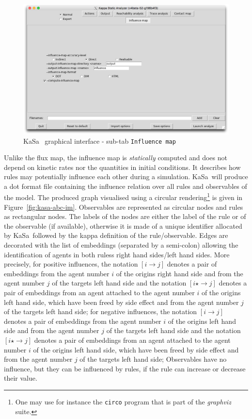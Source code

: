 \documentclass[11pt]{book}
\def\KaSa{\textsf{KaSa}}
\def\ttt#1{\texttt{#1}}
\def\rar{\rightarrow}
\begin{document}
\begin{figure}[htbp]
\centering
\includegraphics[width=12cm,bb=0 0 1904 1208]{img/kasa_5.png}
\caption{\KaSa~ graphical interface - sub-tab \texttt{Influence map}}
\label{fig:kasa:4}
\end{figure}

Unlike the flux map, the influence map is \emph{statically} computed and does not depend on kinetic rates nor the quantities in initial conditions. It describes how rules may potentially influence each other during a simulation. \KaSa~will produce a dot format file containing the influence relation over all rules and observables of the model. The produced graph visualised using a circular rendering\footnote{One may use for instance the \ttt{circo} program that is part of the \textit{graphviz} suite.} is given in Figure~\ref{fig:kasa-abc-im}. Observables are represented as circular nodes and rules as rectangular nodes. The labels of the nodes are either the label of the rule or of the observable (if available), otherwise it is made of a unique identifier allocated by \KaSa~followed by the kappa definition of the rule/observable.
Edges are decorated with the list of embeddings (separated by a semi-colon) allowing the identification of agents in both rules{\textquotesingle}s right hand sides/left hand sides.
More precisely, for positive influences,  the notation $[i\rar j]$ denotes a pair of embeddings from the agent number $i$ of the origin{\textquotesingle}s right hand side and from the agent number $j$ of the target{\textquotesingle}s left hand side and the notation $[i\star \rar j]$ denotes a pair of embeddings from an agent attached to the agent number $i$  of the origin{\textquotesingle}s left hand side, which have been freed by side effect  and   from the agent number $j$ of the target{\textquotesingle}s left hand side; for negative influences,  the notation $[i\rar j]$ denotes a pair of embeddings from the agent number $i$ of the origin{\textquotesingle}s left hand side and from the agent number $j$ of the target{\textquotesingle}s left hand side and the notation $[i\star \rar j]$ denotes a pair of embeddings from an agent attached to the agent number $i$  of the origin{\textquotesingle}s left hand side, which have been freed by side effect  and   from the agent number $j$ of the target{\textquotesingle}s left hand side;
 Observables have no influence, but they can be influenced by rules, if the rule can increase or decrease their value.
\end{document}
